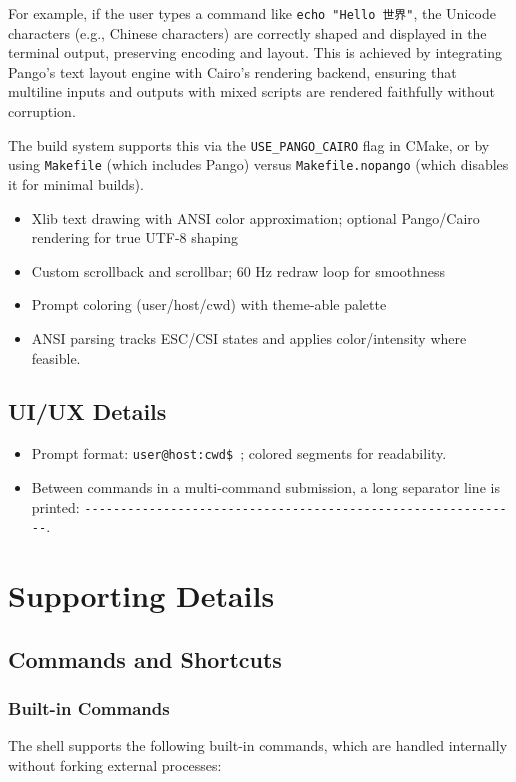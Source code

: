 \documentclass[11pt,a4paper]{article}
\begin{document}
For example, if the user types a command like \texttt{echo "Hello 世界"}, the Unicode characters (e.g., Chinese characters) are correctly shaped and displayed in the terminal output, preserving encoding and layout. This is achieved by integrating Pango's text layout engine with Cairo's rendering backend, ensuring that multiline inputs and outputs with mixed scripts are rendered faithfully without corruption.

The build system supports this via the \texttt{USE\_PANGO\_CAIRO} flag in CMake, or by using \texttt{Makefile} (which includes Pango) versus \texttt{Makefile.nopango} (which disables it for minimal builds).

\begin{itemize}[leftmargin=*]
  \item Xlib text drawing with ANSI color approximation; optional Pango/Cairo rendering for true UTF-8 shaping
  \item Custom scrollback and scrollbar; 60 Hz redraw loop for smoothness
  \item Prompt coloring (user/host/cwd) with theme-able palette
  \item ANSI parsing tracks ESC/CSI states and applies color/intensity where feasible.
\end{itemize}

\subsection{UI/UX Details}
\begin{itemize}[leftmargin=*]
  \item Prompt format: \verb!user@host:cwd$ !; colored segments for readability.
  \item Between commands in a multi-command submission, a long separator line is printed: \verb!-------------------------------------------------------------!.
\end{itemize}

\section{Supporting Details}

\subsection{Commands and Shortcuts}
\subsubsection{Built-in Commands}
The shell supports the following built-in commands, which are handled internally without forking external processes:
\end{document}
